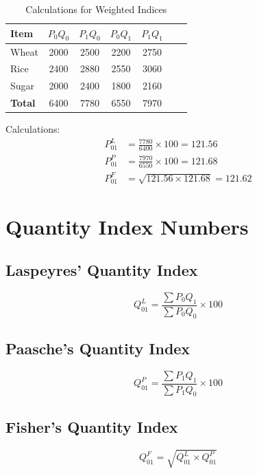 \documentclass[twoside]{book}
\begin{document}
\begin{table}[h]
\centering
\caption{Calculations for Weighted Indices}
\begin{tabular}{lcccccc}
\toprule
\textbf{Item} & $P_0Q_0$ & $P_1Q_0$ & $P_0Q_1$ & $P_1Q_1$ \\
\midrule
Wheat & 2000 & 2500 & 2200 & 2750 \\
Rice & 2400 & 2880 & 2550 & 3060 \\
Sugar & 2000 & 2400 & 1800 & 2160 \\
\midrule
\textbf{Total} & 6400 & 7780 & 6550 & 7970 \\
\bottomrule
\end{tabular}
\end{table}

Calculations:
\begin{align}
    P_{01}^L &= \frac{7780}{6400} \times 100 = 121.56 \\
    P_{01}^P &= \frac{7970}{6550} \times 100 = 121.68 \\
    P_{01}^F &= \sqrt{121.56 \times 121.68} = 121.62
\end{align}

\section{Quantity Index Numbers}

\subsection{Laspeyres' Quantity Index}
\begin{equation}
    Q_{01}^L = \frac{\sum P_0 Q_1}{\sum P_0 Q_0} \times 100
\end{equation}

\subsection{Paasche's Quantity Index}
\begin{equation}
    Q_{01}^P = \frac{\sum P_1 Q_1}{\sum P_1 Q_0} \times 100
\end{equation}

\subsection{Fisher's Quantity Index}
\begin{equation}
    Q_{01}^F = \sqrt{Q_{01}^L \times Q_{01}^P}
\end{equation}
\end{document}
